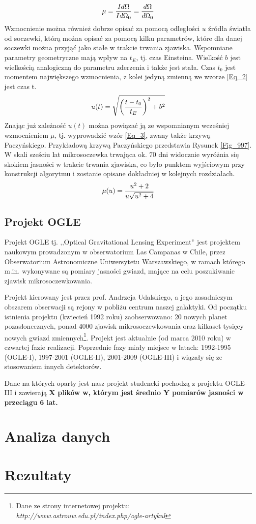\documentclass[a4paper,11pt]{article}
\newcommand{\ak}{\hspace{0.7 cm}}
\begin{document}
\begin{equation}
\centering
\mu=\frac{Id\Omega}{Id\Omega_{0}}=\frac{d\Omega}{d\Omega_{0}}
\label{Eq_1}
\end{equation}
\flushleft
\ak Wzmocnienie można również dobrze opisać za pomocą odległości $u$ źródła światła od soczewki, którą można opisać za pomocą kilku parametrów, które dla danej soczewki można przyjąć jako stałe w trakcie trwania zjawiska. Wspomniane parametry geometryczne mają wpływ na $t_{E}$, tj. czas Einsteina. Wielkość $b$ jest wielkością analogiczną do parametru zderzenia i także jest stała. Czas $t_{0}$ jest momentem największego wzmocnienia, z kolei jedyną zmienną we wzorze \ref{Eq_2} jest czas {t}.
\begin{equation}
\centering
u(t)=\sqrt{\left(\frac{t-t_{0}}{t_{E}}\right)^{2}+b^{2}}
\label{Eq_2}
\end{equation}
\ak Znając już zależność $u(t)$ można powiązać ją ze wspomnianym wcześniej wzmocnieniem $\mu$, tj. wyprowadzić wzór \ref{Eq_3}, zwany także krzywą Paczyńskiego. Przykładową krzywą Paczyńskiego przedstawia Rysunek \ref{Fig_997}. %
W skali sześciu lat mikrosoczewka trwająca ok. $70$ dni widocznie wyróżnia się skokiem jasności w trakcie trwania zjawiska, co było punktem wyjściowym przy konstrukcji algorytmu i zostanie opisane dokładniej w kolejnych rozdziałach.
\begin{equation}
\centering
\mu(u)=\frac{u^{2}+2}{u\sqrt{u^{2}+4}}
\label{Eq_3}
\end{equation}
\flushleft
\subsection{Projekt OGLE}

\ak Projekt OGLE  tj. ,,Optical Gravitational Lensing Experiment'' jest projektem naukowym prowadzonym w obserwatorium Las Campanas w Chile, przez Obserwatorium Astronomiczne Uniwersytetu Warszawskiego, w ramach którego m.in. wykonywane są pomiary jasności gwiazd, mające na celu poszukiwanie zjawisk mikrosoczewkowania. 

\ak Projekt kierowany jest przez prof. Andrzeja Udalskiego, a jego zasadniczym obszarem obserwacji są rejony w pobliżu centrum naszej galaktyki. Od początku istnienia projektu (kwiecień 1992 roku) zaobserwowano: 20 nowych planet pozasłonecznych, ponad 4000 zjawisk mikrosoczewkowania oraz kilkaset tysięcy nowych gwiazd zmiennych\footnote{Dane ze strony internetowej projektu: \textit{http://www.astrouw.edu.pl/index.php/ogle-artykul}}. Projekt jest aktualnie (od marca 2010 roku) w czwartej fazie realizacji. Poprzednie fazy miały miejsce w latach: 1992-1995 (OGLE-I), 1997-2001 (OGLE-II), 2001-2009 (OGLE-III) i wiązały się ze stosowaniem innych detektorów.

\ak Dane na których oparty jest nasz projekt studencki pochodzą z projektu OGLE-III i zawierają \bf{X} plików w, którym jest średnio \bf{Y} pomiarów jasności w przeciągu 6 lat. 
\section{Analiza danych}

\section{Rezultaty}

\end{document}
